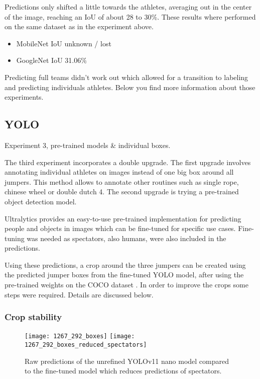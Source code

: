 
Predictions only shifted a little towards the athletes, averaging out in the center of the image, reaching an IoU of about 28 to 30\%. These results where performed on the same dataset as in the experiment above.

\begin{itemize}
    \item MobileNet IoU unknown / lost
    \item GoogleNet IoU 31.06\%
\end{itemize}

Predicting full teams didn't work out which allowed for a transition to labeling and predicting individuals athletes. Below you find more information about those experiments.

\subsection{YOLO}
\label{results:yolo}

Experiment 3, pre-trained models \& individual boxes.

The third experiment incorporates a double upgrade. The first upgrade involves annotating individual athletes on images instead of one big box around all jumpers. This method allows to annotate other routines such as single rope, chinese wheel or double dutch 4. The second upgrade is trying a pre-trained object detection model.

Ultralytics \autocite{Khanam2024} provides an easy-to-use pre-trained implementation for predicting people and objects in images which can be fine-tuned for specific use cases. Fine-tuning was needed as spectators, also humans, were also included in the predictions.

Using these predictions, a crop around the three jumpers can be created using the predicted jumper boxes from the fine-tuned YOLO model, after using the pre-trained weights on the COCO dataset \autocite{Lin2014}. In order to improve the crops some steps were required. Details are discussed below.

\subsubsection{Crop stability}
\label{results:crop-stability}

\begin{figure}
    \centering
    \texttt{[image: 1267\_292\_boxes]}
    \texttt{[image: 1267\_292\_boxes\_reduced\_spectators]}
    \caption[raw vs fine-tuned YOLOv11 nano model predictions]{Raw predictions of the unrefined YOLOv11 nano model compared to the fine-tuned model which reduces predictions of spectators.}
    \label{fig:raw-vs-fine-tuned-boxes}
\end{figure}

